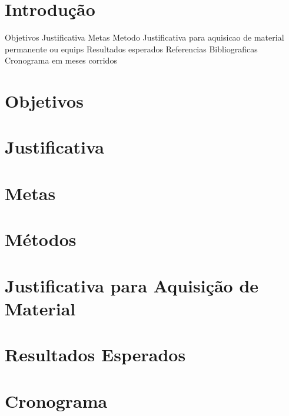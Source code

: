 \documentclass[12pt,portuguese,a4paper,pdftex]{article}
\renewcommand{\headrulewidth}{0.0pt}
\begin{document}
\renewcommand{\headrulewidth}{0.5pt}

\newpage
{}
\pagestyle{plain}
\section{Introdução}\label{sec:introducao}


		Objetivos
		Justificativa
		Metas
		Metodo
		Justificativa para aquisicao de material permanente ou equips
		Resultados esperados
		Referencias Bibliograficas
		Cronograma em meses corridos

\newpage
\section{Objetivos}\label{sec:objetivos}

\newpage
\section{Justificativa}\label{sec:justificativa}

\newpage
\section{Metas}\label{sec:metas}

\newpage
\section{Métodos}\label{sec:metodos}

\newpage
\section{Justificativa para Aquisição de Material}\label{sec:mateiral}

\newpage
\section{Resultados Esperados}\label{sec:resultados}

\newpage
\section{Cronograma}\label{sec:cronograma}


\newpage
{}


\end{document}

